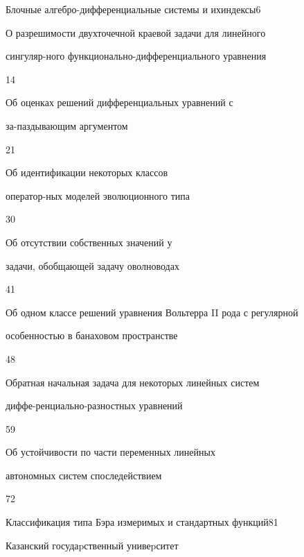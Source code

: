 

{Блочные алгебро-дифференциальные системы и их\newline индексы}{6}




{О разрешимости двухточечной краевой задачи для линейного


сингуляр-\newline ного функционально-дифференциального уравнения}{14}




{Об оценках решений дифференциальных уравнений с


за-\newline паздывающим аргументом}{21}




{Об идентификации некоторых классов


оператор-\newline ных моделей эволюционного типа}{30}




{Об отсутствии  собственных значений у


задачи, обобщающей задачу о\newline волноводах}{41}




{Об одном классе решений уравнения Вольтерра II рода с регулярной\newline 


особенностью в банаховом пространстве}{48}




{Обратная начальная задача для некоторых линейных систем


диффе-\newline ренциально-разностных уравнений}{59}




{Об устойчивости по части переменных линейных  


автономных систем с\newline последействием}{72}




{Классификация типа Бэра измеримых и стандартных функций}{81}

















\vfill


\noindent\raisebox{2pt}{\copyright} Казанский госудаpственный унивеpситет






